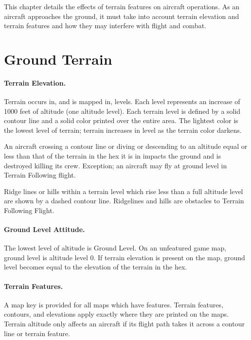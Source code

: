 
This chapter details the effects of terrain features on aircraft operations. As an aircraft approaches the ground, it must take into account terrain elevation and terrain features and how they may interfere with flight and combat.

\section{Ground Terrain}
\label{rule:ground-terrain}

\paragraph{Terrain Elevation.} Terrain occurs in, and is mapped in, levels. Each level represents an increase of 1000 feet of altitude (one altitude level). Each terrain level is defined by a solid contour line and a solid color printed over the entire area. The lightest color is the lowest level of terrain; terrain increases in level as the terrain color darkens.

An aircraft crossing a contour line or diving or descending to an altitude equal or less than that of the terrain in the hex it is in impacts the ground and is destroyed killing its crew. Exception; an aircraft may fly at ground level in Terrain Following flight.

Ridge lines or hills within a terrain level which rise less than a full altitude level are shown by a dashed contour line. Ridgelines and hills are obstacles to Terrain Following Flight.

\paragraph{Ground Level Attitude.} The lowest level of altitude is Ground Level. On an unfeatured game map, ground level is altitude level 0. If terrain elevation is present on the map, ground level becomes equal to the elevation of the terrain in the hex.

\paragraph{Terrain Features.} A map key is provided for all maps which have features. Terrain features, contours, and elevations apply exactly where they are printed on the maps. Terrain altitude only affects an aircraft if its flight path takes it across a contour line or terrain feature.

